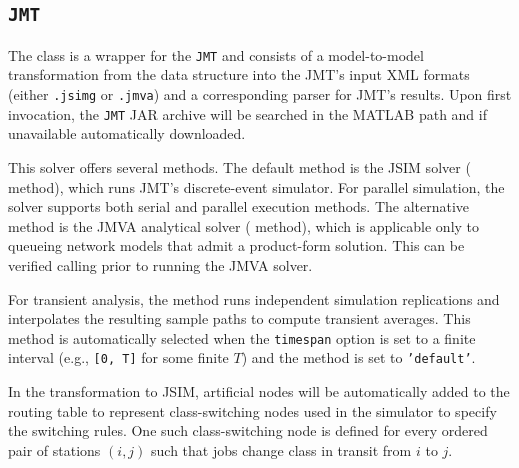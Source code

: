 
\subsection{\texttt{JMT}}
The class is a wrapper for the \texttt{JMT} and consists of a model-to-model transformation from the  data structure into the JMT's input XML formats (either \texttt{.jsimg} or \texttt{.jmva}) and a corresponding parser for JMT's results. Upon first invocation, the \texttt{JMT} JAR archive will be searched in the MATLAB path and if unavailable automatically downloaded.

This solver offers several methods. The default method is the JSIM solver ( method), which runs JMT's discrete-event simulator. For parallel simulation, the solver supports both serial and parallel execution methods. The alternative method is the JMVA analytical solver ( method), which is applicable only to queueing network models that admit a product-form solution. This can be verified calling  prior to running the JMVA solver.

For transient analysis, the  method runs independent simulation replications and interpolates the resulting sample paths to compute transient averages. This method is automatically selected when the \texttt{timespan} option is set to a finite interval (e.g., \texttt{[0, T]} for some finite $T$) and the method is set to \texttt{'default'}.

In the transformation to JSIM, artificial nodes will be automatically added to the routing table to represent class-switching nodes used in the simulator to specify the switching rules. One such class-switching node is defined for every ordered pair of stations $(i,j)$ such that jobs change class in transit from $i$ to $j$.


